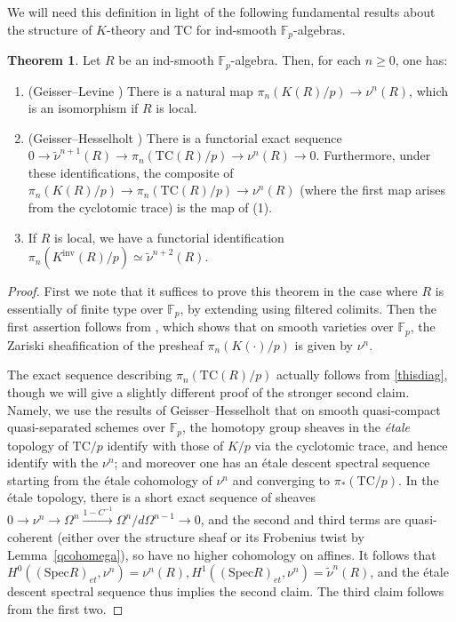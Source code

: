 \documentclass{amsart}
\newcommand{\knf}{K^{\mathrm{inv}}}
\newcommand{\spec}{\mathrm{Spec}}
\theoremstyle{definition}
\newtheorem{theorem}[definition]{Theorem}
\newcommand{\TC}{\mathrm{TC}}
\begin{document}
We will need this definition in 
light of the following fundamental results about the structure of $K$-theory
and $\TC$ for ind-smooth $\mathbb{F}_p$-algebras. 
\begin{theorem}
Let $R$ be an ind-smooth $\mathbb{F}_p$-algebra.  Then, for each $n \geq 0$, one has:
\begin{enumerate}
\item (Geisser--Levine \cite{GL}) There is a natural map
$\pi_n ( K(R)/p) \rightarrow \nu^n(R)$, which is an isomorphism if $R$ is local. 
\item (Geisser--Hesselholt \cite{GH}) There is a functorial exact sequence
$0 \to \widetilde{\nu}^{n+1}(R) \to \pi_n ( \TC(R)/p) \to  {\nu}^{n}(R) \to 0$.
Furthermore, under these identifications, the composite 
of $\pi_n  ( K(R)/p) \to \pi_n (\TC(R)/p) \to \nu^n(R) $ (where the first map
arises from the cyclotomic trace) is the map of (1).
\item If $R$ is local, we have a functorial identification $\pi_n ( \knf(R)/p) \simeq \widetilde{\nu}^{n+2}(R)$.
\end{enumerate}
\label{GHGL}
\end{theorem} 
\begin{proof} 
First we note that it suffices to prove this theorem in the case where $R$ is essentially of finite type over $\mathbb{F}_p$, by extending using filtered colimits.
Then the first assertion follows from \cite[Thm.~8.3]{GL}, 
which shows that on smooth varieties over $\mathbb{F}_p$, the Zariski
sheafification of  
the presheaf
$\pi_n(K(\cdot)/p)$
is given by $\nu^n$.

The exact sequence describing $\pi_n( \TC(R)/p)$ actually follows from
\eqref{thisdiag}, though we will give a slightly different proof of the
stronger second claim. 
Namely, we use the results of Geisser--Hesselholt \cite[Thm.~4.2.6]{GH}
that on smooth quasi-compact quasi-separated schemes over $\mathbb{F}_p$,
the homotopy group sheaves in the \emph{\'etale} topology of $\TC/p$ identify with those of $K/p$ via the cyclotomic trace, and hence identify with the $\nu^n$; and moreover one has an \'etale descent spectral
sequence starting from the \'etale cohomology of $\nu^n$ and converging to
$\pi_*( \TC/p)$. 
In the \'etale topology, there is a short exact sequence of sheaves $0 \to \nu^n \to
\Omega^n \xrightarrow{1 - C^{-1}} \Omega^n/d \Omega^{n-1} \to 0$, and the
second and third terms are quasi-coherent (either over the structure sheaf or
its Frobenius twist by Lemma~\ref{qcohomega}), so have no higher cohomology on affines.  
It follows that $H^0( (\spec R)_{et}, \nu^n) = \nu^n(R), H^1( (\spec R)_{et}, \nu^n) =
\widetilde{\nu}^n(R)$, and the \'etale descent spectral sequence thus implies
the second claim.  The third claim follows from the first two. 
\end{proof} 
\end{document}
